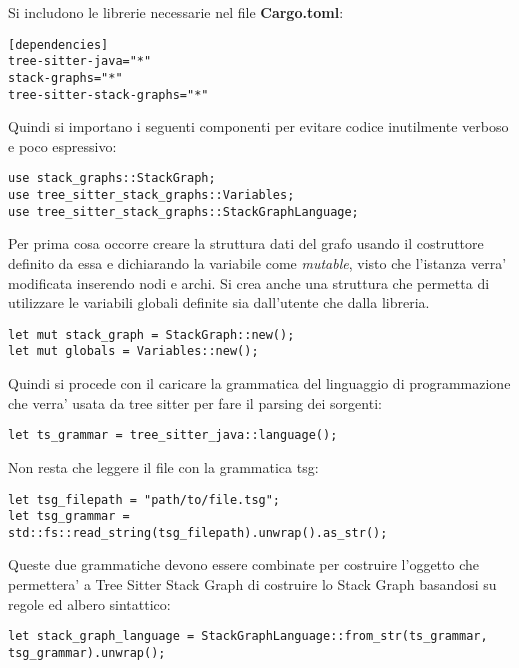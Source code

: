 Si includono le librerie necessarie nel file \textbf{Cargo.toml}:

\begin{Verbatim}[samepage=true]
[dependencies]
tree-sitter-java="*"
stack-graphs="*"
tree-sitter-stack-graphs="*"
\end{Verbatim}

Quindi si importano i seguenti componenti per evitare codice inutilmente verboso e poco espressivo:
\begin{Verbatim}[samepage=true]
use stack_graphs::StackGraph;
use tree_sitter_stack_graphs::Variables; 
use tree_sitter_stack_graphs::StackGraphLanguage; 
\end{Verbatim}

Per prima cosa occorre creare la struttura dati del grafo usando il costruttore definito da essa e dichiarando la variabile come \emph{mutable}, visto che l'istanza verra' modificata inserendo nodi e archi.
Si crea anche una struttura che permetta di utilizzare le variabili globali definite sia dall'utente che dalla libreria.

\begin{Verbatim}[samepage=true]
let mut stack_graph = StackGraph::new();
let mut globals = Variables::new();
\end{Verbatim}

Quindi si procede con il caricare la grammatica del linguaggio di programmazione che verra' usata da tree sitter per fare il parsing dei sorgenti:

\begin{Verbatim}[samepage=true]
let ts_grammar = tree_sitter_java::language();
\end{Verbatim}

Non resta che leggere il file con la grammatica tsg:

\begin{Verbatim}[samepage=true]
let tsg_filepath = "path/to/file.tsg";
let tsg_grammar = std::fs::read_string(tsg_filepath).unwrap().as_str();
\end{Verbatim}

Queste due grammatiche devono essere combinate per costruire l'oggetto che permettera' a Tree Sitter Stack Graph di costruire lo Stack Graph basandosi su regole ed albero sintattico:

\begin{Verbatim}[samepage=true]
let stack_graph_language = StackGraphLanguage::from_str(ts_grammar, tsg_grammar).unwrap();
\end{Verbatim}

